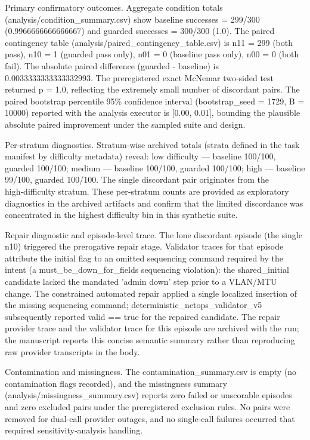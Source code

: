 \documentclass[conference]{IEEEtran}
\begin{document}
Primary confirmatory outcomes. Aggregate condition totals (analysis/condition\_summary.csv) show baseline successes = 299/300 (0.9966666666666667) and guarded successes = 300/300 (1.0). The paired contingency table (analysis/paired\_contingency\_table.csv) is n11 = 299 (both pass), n10 = 1 (guarded pass only), n01 = 0 (baseline pass only), n00 = 0 (both fail). The absolute paired difference (guarded - baseline) is 0.0033333333333332993. The preregistered exact McNemar two‑sided test returned p = 1.0, reflecting the extremely small number of discordant pairs. The paired bootstrap percentile 95\% confidence interval (bootstrap\_seed = 1729, B = 10000) reported with the analysis executor is [0.00, 0.01], bounding the plausible absolute paired improvement under the sampled suite and design.

Per‑stratum diagnostics. Stratum‑wise archived totals (strata defined in the task manifest by difficulty metadata) reveal: low difficulty --- baseline 100/100, guarded 100/100; medium --- baseline 100/100, guarded 100/100; high --- baseline 99/100, guarded 100/100. The single discordant pair originates from the high‑difficulty stratum. These per‑stratum counts are provided as exploratory diagnostics in the archived artifacts and confirm that the limited discordance was concentrated in the highest difficulty bin in this synthetic suite.

Repair diagnostic and episode‑level trace. The lone discordant episode (the single n10) triggered the prerogative repair stage. Validator traces for that episode attribute the initial flag to an omitted sequencing command required by the intent (a must\_be\_down\_for\_fields sequencing violation): the shared\_initial candidate lacked the mandated 'admin down' step prior to a VLAN/MTU change. The constrained automated repair applied a single localized insertion of the missing sequencing command; deterministic\_netops\_validator\_v5 subsequently reported valid == true for the repaired candidate. The repair provider trace and the validator trace for this episode are archived with the run; the manuscript reports this concise semantic summary rather than reproducing raw provider transcripts in the body.

Contamination and missingness. The contamination\_summary.csv is empty (no contamination flags recorded), and the missingness summary (analysis/missingness\_summary.csv) reports zero failed or unscorable episodes and zero excluded pairs under the preregistered exclusion rules. No pairs were removed for dual‑call provider outages, and no single‑call failures occurred that required sensitivity‑analysis handling.
\end{document}
